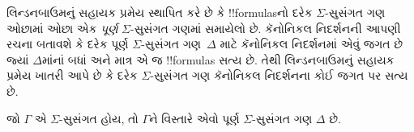 \documentclass[../../../include/open-logic-section]{subfiles}
\begin{document}


લિન્ડનબાઉમનું સહાયક પ્રમેય સ્થાપિત કરે છે કે !!{formula}sનો દરેક
$\Sigma$-સુસંગત ગણ ઓછામાં ઓછા એક \emph{પૂર્ણ} $\Sigma$-સુસંગત ગણમાં
સમાયેલો છે. કૅનોનિકલ નિદર્શનની આપણી રચના બતાવશે કે દરેક પૂર્ણ
$\Sigma$-સુસંગત ગણ~$\Delta$ માટે કૅનોનિકલ નિદર્શનમાં એવું જગત છે
જ્યાં $\Delta$માંનાં બધાં અને માત્ર એ જ !!{formula}s સત્ય છે. તેથી
લિન્ડનબાઉમનું સહાયક પ્રમેય ખાતરી આપે છે કે દરેક $\Sigma$-સુસંગત ગણ
કૅનોનિકલ નિદર્શનના કોઈ જગત પર સત્ય છે.

\begin{thm}
  જો $\Gamma$ એ $\Sigma$-સુસંગત હોય, તો $\Gamma$ને વિસ્તારે એવો
  પૂર્ણ $\Sigma$-સુસંગત ગણ $\Delta$ છે.
\end{thm}
\end{document}
